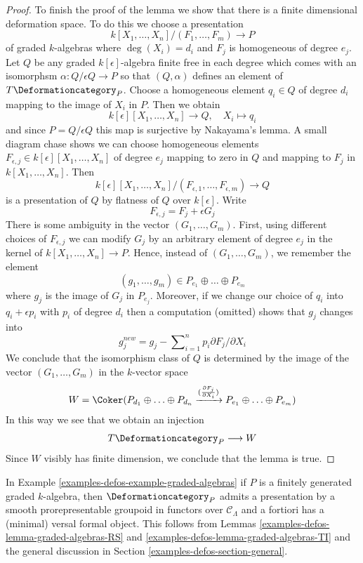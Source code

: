 \begin{proof}
\medskip\noindent
To finish the proof of the lemma we show that there is a finite
dimensional deformation space. To do this we
choose a presentation
$$
k[X_1, \ldots, X_n]/(F_1, \ldots, F_m) \longrightarrow P
$$
of graded $k$-algebras where $\deg(X_i) = d_i$ and
$F_j$ is homogeneous of degree $e_j$.
Let $Q$ be any graded $k[\epsilon]$-algebra
finite free in each degree which comes with an isomorphsm
$\alpha : Q/\epsilon Q \to P$ so that $(Q, \alpha)$ defines
an element of $T\Deformationcategory_P$.
Choose a homogeneous element $q_i \in Q$ of degree $d_i$
mapping to the image of $X_i$ in $P$.
Then we obtain
$$
k[\epsilon][X_1, \ldots, X_n] \longrightarrow Q,\quad
X_i \longmapsto q_i
$$
and since $P = Q/\epsilon Q$ this map is surjective by Nakayama's lemma.
A small diagram chase shows we can choose homogeneous elements
$F_{\epsilon, j} \in k[\epsilon][X_1, \ldots, X_n]$ of degree $e_j$
mapping to zero in $Q$ and mapping to $F_j$ in $k[X_1, \ldots, X_n]$.
Then
$$
k[\epsilon][X_1, \ldots, X_n]/(F_{\epsilon, 1}, \ldots, F_{\epsilon, m})
\longrightarrow Q
$$
is a presentation of $Q$ by flatness of $Q$ over $k[\epsilon]$.
Write
$$
F_{\epsilon, j} =  F_j + \epsilon G_j
$$
There is some ambiguity in the vector $(G_1, \ldots, G_m)$.
First, using different choices of $F_{\epsilon, j}$
we can modify $G_j$ by an arbitrary element of degree $e_j$
in the kernel of $k[X_1, \ldots, X_n] \to P$.
Hence, instead of $(G_1, \ldots, G_m)$, we remember the
element
$$
(g_1, \ldots, g_m) \in P_{e_1} \oplus \ldots \oplus P_{e_m}
$$
where $g_j$ is the image of $G_j$ in $P_{e_j}$.
Moreover, if we change our choice of $q_i$ into $q_i + \epsilon p_i$
with $p_i$ of degree $d_i$ then a computation (omitted) shows
that $g_j$ changes into
$$
g_j^{new} = g_j - \sum\nolimits_{i = 1}^n p_i \partial F_j / \partial X_i
$$
We conclude that the isomorphism class of $Q$ is determined by the
image of the vector $(G_1, \ldots, G_m)$ in the $k$-vector space
$$
W  = \Coker(P_{d_1} \oplus \ldots \oplus P_{d_n}
\xrightarrow{(\frac{\partial F_j}{\partial X_i})}
P_{e_1} \oplus \ldots \oplus P_{e_m})
$$
In this way we see that we obtain an injection
$$
T\Deformationcategory_P \longrightarrow W
$$
Since $W$ visibly has finite dimension, we conclude that the lemma is true.
\end{proof}

In Example \ref{examples-defos-example-graded-algebras} if $P$ is a finitely generated
graded $k$-algebra, then $\Deformationcategory_P$
admits a presentation by a smooth prorepresentable groupoid in functors
over $\mathcal{C}_\Lambda$
and a fortiori has a (minimal) versal formal object. This follows
from Lemmas \ref{examples-defos-lemma-graded-algebras-RS} and
\ref{examples-defos-lemma-graded-algebras-TI}
and the general discussion in Section \ref{examples-defos-section-general}.

